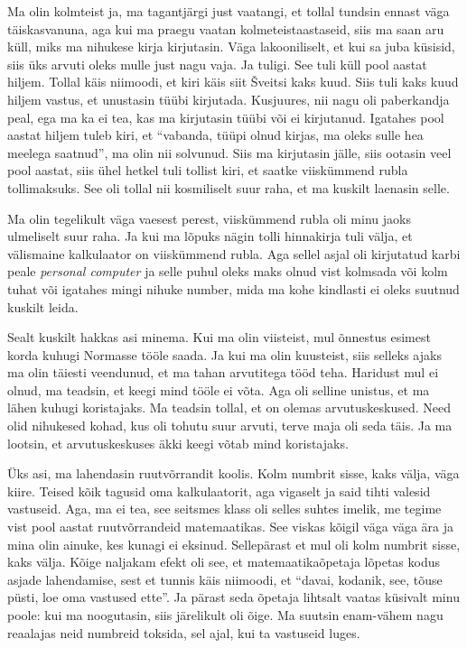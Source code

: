 Ma olin kolmteist ja, ma  tagantjärgi just vaatangi, et tollal tundsin ennast 
väga täiskasvanuna, aga kui ma praegu vaatan kolmeteistaastaseid, siis ma saan 
aru küll, miks ma nihukese kirja kirjutasin. Väga lakooniliselt, et kui sa juba 
küsisid, siis üks arvuti oleks mulle just nagu vaja. Ja tuligi. See tuli küll 
pool aastat hiljem. Tollal käis niimoodi, et kiri käis siit Šveitsi kaks kuud. 
Siis tuli kaks kuud hiljem vastus, et unustasin tüübi kirjutada. Kusjuures, nii 
nagu oli paberkandja peal, ega ma ka ei tea, kas ma kirjutasin tüübi või ei 
kirjutanud. Igatahes pool aastat hiljem tuleb kiri, et \enquote{vabanda, tüüpi 
olnud kirjas, ma oleks sulle hea meelega saatnud}, ma olin nii solvunud. Siis 
ma kirjutasin jälle, siis ootasin veel pool aastat, siis ühel hetkel tuli 
tollist kiri, et  saatke viiskümmend rubla tollimaksuks. See oli tollal nii 
kosmiliselt suur raha, 
et ma kuskilt laenasin selle. 


Ma olin tegelikult väga vaesest perest, viiskümmend rubla oli minu jaoks 
ulmeliselt suur raha. Ja kui ma lõpuks nägin tolli hinnakirja tuli välja, et 
välismaine kalkulaator on viiskümmend rubla. Aga sellel asjal oli kirjutatud 
karbi peale \emph{personal computer} ja selle puhul oleks maks olnud vist 
kolmsada või kolm tuhat või igatahes mingi nihuke number, mida ma kohe 
kindlasti ei oleks suutnud kuskilt leida. 

Sealt kuskilt hakkas asi minema. Kui ma olin viisteist,  mul õnnestus esimest 
korda kuhugi Normasse tööle saada. Ja kui ma olin kuusteist, siis selleks ajaks 
ma olin täiesti veendunud, et ma tahan arvutitega tööd teha. Haridust mul ei 
olnud, ma teadsin, et keegi mind tööle ei võta. Aga oli selline unistus, et ma 
lähen kuhugi koristajaks. Ma teadsin tollal, et on olemas arvutuskeskused. Need 
olid nihukesed kohad, kus oli tohutu suur arvuti, terve maja oli seda täis. Ja 
ma lootsin, et arvutuskeskuses äkki keegi võtab mind koristajaks. 


Üks asi, ma lahendasin ruutvõrrandit koolis. Kolm numbrit sisse, kaks välja, 
väga kiire. Teised kõik tagusid oma kalkulaatorit, aga vigaselt ja said tihti 
valesid vastuseid. Aga, ma ei tea, see seitsmes klass oli selles suhtes imelik, 
me tegime vist pool aastat ruutvõrrandeid matemaatikas. See viskas kõigil  väga 
väga ära ja mina olin ainuke, kes kunagi ei eksinud. Sellepärast et mul oli 
kolm numbrit sisse, kaks välja. Kõige naljakam efekt oli see, et 
matemaatikaõpetaja lõpetas kodus asjade lahendamise, sest et tunnis käis 
niimoodi, et \enquote{davai, kodanik, see, tõuse püsti, loe oma vastused ette}. 
Ja pärast seda õpetaja lihtsalt vaatas küsivalt minu poole: kui ma noogutasin, 
siis  järelikult oli õige. Ma suutsin enam-vähem nagu reaalajas neid numbreid 
toksida, sel ajal, kui ta vastuseid luges. 

